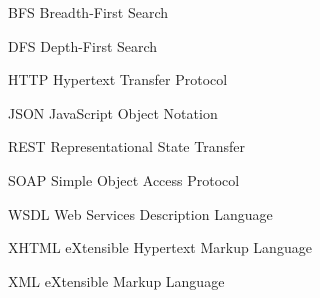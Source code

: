 \begin{siglas}
  \item[BFS] Breadth-First Search
  \item[DFS] Depth-First Search
  \item[HTTP] Hypertext Transfer Protocol
  \item[JSON] JavaScript Object Notation
  \item[REST] Representational State Transfer
  \item[SOAP] Simple Object Access Protocol
  \item[WSDL] Web Services Description Language
  \item[XHTML] eXtensible Hypertext Markup Language
  \item[XML] eXtensible Markup Language
\end{siglas}
